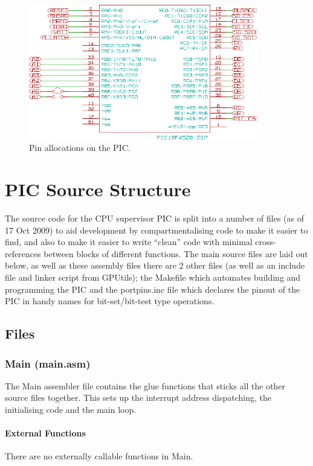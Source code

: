 \documentclass[a4paper,10pt]{book}
\begin{document}
\begin{figure}[h]
 \begin{center}
  \includegraphics[width=10cm]{pic_pinout.pdf}
 \end{center}
 \caption{Pin allocations on the PIC.}
 \label{fig:picpinout}
\end{figure}

\chapter{PIC Source Structure}
The source code for the CPU supervisor PIC is split into a number of files (as of 17 Oct 2009) to aid development by compartmentalising code to make it easier to find, and also to make it easier to write ``clean'' code with minimal cross-references between blocks of different functions.  The main source files are laid out below, as well as these assembly files there are 2 other files (as well as an include file and linker script from GPUtils); the Makefile which automates building and programming the PIC and the portpins.inc file which declares the pinout of the PIC in handy names for bit-set/bit-test type operations.

\section{Files}
\subsection{Main (main.asm)}
The Main assembler file contains the glue functions that sticks all the other source files together.  This sets up the interrupt address dispatching, the initialising code and the main loop.

\subsubsection{External Functions}
There are no externally callable functions in Main.
\end{document}
